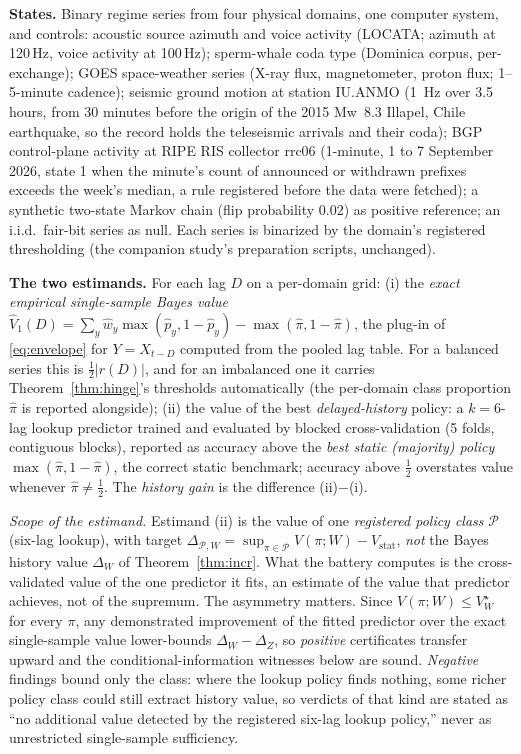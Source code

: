 \documentclass[11pt]{article}
\begin{document}
\textbf{States.} Binary regime series from four physical domains, one
computer system, and controls: acoustic source azimuth and voice activity (LOCATA; azimuth at 120\,Hz, voice activity at 100\,Hz);
sperm-whale coda type (Dominica corpus, per-exchange); GOES space-weather
series (X-ray flux, magnetometer, proton flux; 1--5-minute cadence); seismic
ground motion at station IU.ANMO (1~Hz over 3.5 hours, from 30 minutes
before the origin of the 2015 Mw~8.3 Illapel, Chile earthquake, so the
record holds the teleseismic arrivals and their coda); BGP control-plane
activity at RIPE RIS collector rrc06 (1-minute, 1 to 7 September 2026,
state 1 when the minute's count of announced or withdrawn prefixes exceeds
the week's median, a rule registered before the data were fetched); a synthetic two-state Markov chain
(flip probability $0.02$) as positive reference; an i.i.d.\ fair-bit series
as null. Each series is binarized by the domain's registered thresholding
(the companion study's preparation scripts, unchanged).

\textbf{The two estimands.} For each lag $D$ on a per-domain grid:
(i) the \emph{exact empirical single-sample Bayes value}
$\widehat V_1(D)=\sum_y \hat w_y \max(\hat p_y, 1-\hat p_y)
-\max(\hat\pi,1-\hat\pi)$, the plug-in of \eqref{eq:envelope} for
$Y=X_{t-D}$ computed from the pooled lag table. For a balanced series
this is $\tfrac12|r(D)|$, and for an imbalanced one it carries
Theorem~\ref{thm:hinge}'s thresholds automatically (the per-domain class
proportion $\hat\pi$ is reported alongside); (ii) the value of the best
\emph{delayed-history} policy: a $k{=}6$-lag lookup predictor trained and
evaluated by blocked cross-validation (5 folds, contiguous blocks),
reported as accuracy above the \emph{best static (majority) policy}
$\max(\hat\pi,1-\hat\pi)$, the correct static benchmark; accuracy above
$\tfrac12$ overstates value whenever $\hat\pi\neq\tfrac12$. The
\emph{history gain} is the difference (ii)$-$(i).

\emph{Scope of the estimand.} Estimand (ii) is the value of one
\emph{registered policy class} $\mathcal P$ (six-lag lookup), with target
$\Delta_{\mathcal P,W}=\sup_{\pi\in\mathcal P}V(\pi;W)
-V_{\mathrm{stat}}$, \emph{not} the Bayes history value $\Delta_W$ of
Theorem~\ref{thm:incr}. What the battery computes is the cross-validated
value of the one predictor it fits, an estimate of the value that
predictor achieves, not of the supremum. The asymmetry matters. Since
$V(\pi;W)\le V^\star_W$ for every $\pi$, any demonstrated improvement of
the fitted predictor over the exact single-sample value lower-bounds
$\Delta_W-\Delta_Z$, so
\emph{positive} certificates transfer upward and the conditional-information
witnesses below are sound. \emph{Negative} findings bound only the class:
where the lookup policy finds nothing, some richer policy class could still
extract history value, so verdicts of that kind are stated as ``no
additional value detected by the registered six-lag lookup policy,'' never
as unrestricted single-sample sufficiency.
\end{document}
